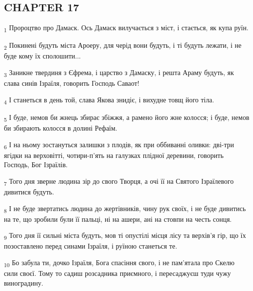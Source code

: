\subsection{CHAPTER 17}
\begin{tcolorbox}
\textsubscript{1} Пророцтво про Дамаск. Ось Дамаск вилучається з міст, і стається, як купа руїн.
\end{tcolorbox}
\begin{tcolorbox}
\textsubscript{2} Покинені будуть міста Ароеру, для черід вони будуть, і ті будуть лежати, і не буде кому їх сполошити...
\end{tcolorbox}
\begin{tcolorbox}
\textsubscript{3} Заникне твердиня з Єфрема, і царство з Дамаску, і решта Араму будуть, як слава синів Ізраїля, говорить Господь Саваот!
\end{tcolorbox}
\begin{tcolorbox}
\textsubscript{4} І станеться в день той, слава Якова знидіє, і вихудне товщ його тіла.
\end{tcolorbox}
\begin{tcolorbox}
\textsubscript{5} І буде, немов би жнець збирає збіжжя, а рамено його жне колосся; і буде, немов би збирають колосся в долині Рефаїм.
\end{tcolorbox}
\begin{tcolorbox}
\textsubscript{6} І на ньому зостануться залишки з плодів, як при оббиванні оливки: дві-три ягідки на верховітті, чотири-п'ять на галузках плідної деревини, говорить Господь, Бог Ізраїлів.
\end{tcolorbox}
\begin{tcolorbox}
\textsubscript{7} Того дня зверне людина зір до свого Творця, а очі її на Святого Ізраїлевого дивитися будуть.
\end{tcolorbox}
\begin{tcolorbox}
\textsubscript{8} І не буде звертатись людина до жертівників, чину рук своїх, і не буде дивитись на те, що зробили були її пальці, ні на ашери, ані на стовпи на честь сонця.
\end{tcolorbox}
\begin{tcolorbox}
\textsubscript{9} Того дня її сильні міста будуть, мов ті опустілі місця лісу та верхів'я гір, що їх позоставлено перед синами Ізраїля, і руїною станеться те.
\end{tcolorbox}
\begin{tcolorbox}
\textsubscript{10} Бо забула ти, дочко Ізраїля, Бога спасіння свого, і не пам'ятала про Скелю сили своєї. Тому то садиш розсадника приємного, і пересаджуєш туди чужу виноградину.
\end{tcolorbox}
